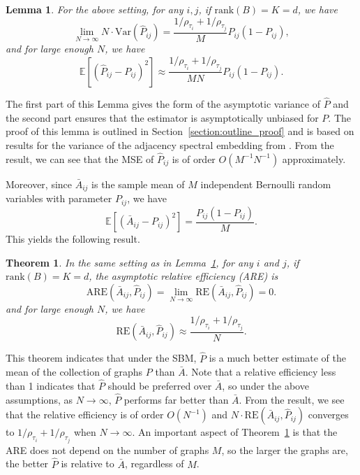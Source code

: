 \documentclass[10pt,letterpaper]{article}
\newtheorem{lemma}[fact]{Lemma}
\newtheorem{theorem}[fact]{Theorem}
\newcommand{\Ex}{\mathbb{E}}
\renewcommand{\hat}{\widehat}
\begin{document}
\begin{lemma}
\label{lm:VarPhat}
For the above setting, for any $i, j$, if $\mathrm{rank}(B)=K=d$, we have
\[
    \lim_{N \to \infty} N \cdot \mathrm{Var}(\hat{P}_{ij}) =
    \frac{1/\rho_{\tau_i} + 1/\rho_{\tau_j}}{M} P_{ij} (1 - P_{ij}),
\]
and for large enough $N$, we have
\[
    \Ex[(\hat{P}_{ij} - P_{ij})^2] \approx
    \frac{1/\rho_{\tau_i} + 1/\rho_{\tau_j}}{M N} P_{ij}(1-P_{ij}).
\]
\end{lemma}
The first part of this Lemma gives the form of the asymptotic variance of $\hat{P}$ and the second part ensures that the estimator is asymptotically unbiased for $P$.
The proof of this lemma is outlined in Section~\ref{section:outline_proof} and is based on results for the variance of the adjacency spectral embedding from \cite{athreya2013limit}. From the result, we can see that the MSE of $\hat{P}_{ij}$ is of order $O(M^{-1}N^{-1})$ approximately.

Moreover, since $\bar{A}_{ij}$ is the sample mean of $M$ independent Bernoulli random variables with parameter $P_{ij}$, we have
\[
    \Ex[(\bar{A}_{ij} - P_{ij})^2] = \frac{P_{ij}(1-P_{ij})}{M}.
\]
This yields the following result.
\begin{theorem}
\label{thm:ARE}
In the same setting as in Lemma~\ref{lm:VarPhat}, for any $i$ and $j$, if $\mathrm{rank}(B)=K=d$, the asymptotic relative efficiency (ARE) is 
\[
    \mathrm{ARE}(\bar{A}_{ij}, \hat{P}_{ij}) = \lim_{N \to \infty} \mathrm{RE}(\bar{A}_{ij}, \hat{P}_{ij}) = 0.
    \label{eq:sbm_are}
\]
and for large enough $N$, we have
\begin{equation}
	    \mathrm{RE}(\bar{A}_{ij}, \hat{P}_{ij}) \approx
    \frac{1/\rho_{\tau_i} + 1/\rho_{\tau_j}}{N}.
\label{eq:approx_re}
\end{equation}
\end{theorem}


This theorem indicates that under the SBM, $\hat{P}$ is a much better estimate of the mean of the collection of graphs $P$ than $\bar{A}$.
Note that a relative efficiency less than 1 indicates that $\hat{P}$ should be preferred over $\bar{A}$, so under the above assumptions, as $N\to\infty$, $\hat{P}$ performs far better than $\bar{A}$.
From the result, we see that the relative efficiency is of order $O(N^{-1})$ and $N \cdot \mathrm{RE}(\bar{A}_{ij}, \hat{P}_{ij})$ converges to $1/\rho_{\tau_i}+1/\rho_{\tau_j}$ when $N\to\infty$.
An important aspect of Theorem~\ref{thm:ARE} is that the ARE does not depend on the number of graphs $M$, so the larger the graphs are, the better $\hat{P}$ is relative to $\bar{A}$, regardless of $M$.
\end{document}
